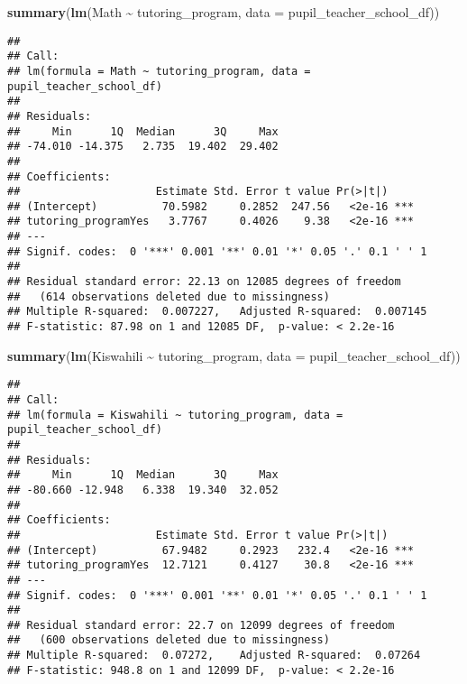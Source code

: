 \documentclass[
]{article}
\newenvironment{Shaded}{\begin{snugshade}}{\end{snugshade}}
\newcommand{\AttributeTok}[1]{\textcolor[rgb]{0.13,0.29,0.53}{#1}}
\newcommand{\FunctionTok}[1]{\textcolor[rgb]{0.13,0.29,0.53}{\textbf{#1}}}
\newcommand{\NormalTok}[1]{#1}
\newcommand{\SpecialCharTok}[1]{\textcolor[rgb]{0.81,0.36,0.00}{\textbf{#1}}}
\begin{document}
\begin{Shaded}
\begin{Highlighting}[]
\FunctionTok{summary}\NormalTok{(}\FunctionTok{lm}\NormalTok{(Math }\SpecialCharTok{\textasciitilde{}}\NormalTok{ tutoring\_program, }\AttributeTok{data =}\NormalTok{ pupil\_teacher\_school\_df))}
\end{Highlighting}
\end{Shaded}

\begin{verbatim}
## 
## Call:
## lm(formula = Math ~ tutoring_program, data = pupil_teacher_school_df)
## 
## Residuals:
##     Min      1Q  Median      3Q     Max 
## -74.010 -14.375   2.735  19.402  29.402 
## 
## Coefficients:
##                     Estimate Std. Error t value Pr(>|t|)    
## (Intercept)          70.5982     0.2852  247.56   <2e-16 ***
## tutoring_programYes   3.7767     0.4026    9.38   <2e-16 ***
## ---
## Signif. codes:  0 '***' 0.001 '**' 0.01 '*' 0.05 '.' 0.1 ' ' 1
## 
## Residual standard error: 22.13 on 12085 degrees of freedom
##   (614 observations deleted due to missingness)
## Multiple R-squared:  0.007227,   Adjusted R-squared:  0.007145 
## F-statistic: 87.98 on 1 and 12085 DF,  p-value: < 2.2e-16
\end{verbatim}

\begin{Shaded}
\begin{Highlighting}[]
\FunctionTok{summary}\NormalTok{(}\FunctionTok{lm}\NormalTok{(Kiswahili }\SpecialCharTok{\textasciitilde{}}\NormalTok{ tutoring\_program, }\AttributeTok{data =}\NormalTok{ pupil\_teacher\_school\_df))}
\end{Highlighting}
\end{Shaded}

\begin{verbatim}
## 
## Call:
## lm(formula = Kiswahili ~ tutoring_program, data = pupil_teacher_school_df)
## 
## Residuals:
##     Min      1Q  Median      3Q     Max 
## -80.660 -12.948   6.338  19.340  32.052 
## 
## Coefficients:
##                     Estimate Std. Error t value Pr(>|t|)    
## (Intercept)          67.9482     0.2923   232.4   <2e-16 ***
## tutoring_programYes  12.7121     0.4127    30.8   <2e-16 ***
## ---
## Signif. codes:  0 '***' 0.001 '**' 0.01 '*' 0.05 '.' 0.1 ' ' 1
## 
## Residual standard error: 22.7 on 12099 degrees of freedom
##   (600 observations deleted due to missingness)
## Multiple R-squared:  0.07272,    Adjusted R-squared:  0.07264 
## F-statistic: 948.8 on 1 and 12099 DF,  p-value: < 2.2e-16
\end{verbatim}
\end{document}
